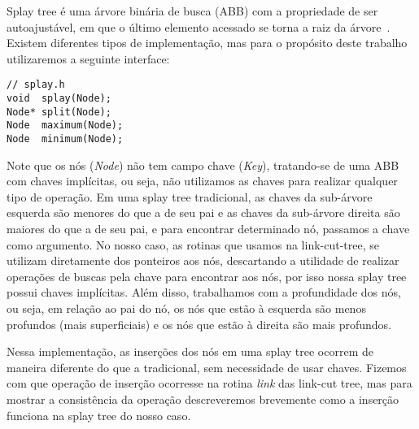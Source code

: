 Splay tree é uma árvore binária de busca (ABB) com a propriedade de ser autoajustável, em que o último elemento acessado se torna a raiz da árvore~\cite{SleatorT1985}. Existem diferentes tipos de implementação, mas para o propósito deste trabalho utilizaremos a seguinte interface:  




\begin{verbatim}
// splay.h
void  splay(Node);
Node* split(Node);
Node  maximum(Node);
Node  minimum(Node);
\end{verbatim}

Note que os nós (\textit{Node}) não tem campo chave (\textit{Key}), tratando-se de uma ABB com chaves implícitas, ou seja, não utilizamos as chaves para realizar qualquer tipo de operação. Em uma splay tree tradicional, as chaves da sub-árvore esquerda são menores do que a de seu pai e as chaves da sub-árvore direita são maiores do que a de seu pai, e para encontrar determinado nó, passamos a chave como argumento. No nosso caso, as rotinas que usamos na link-cut-tree, se utilizam diretamente dos ponteiros aos nós, descartando a utilidade de realizar operações de buscas pela chave para encontrar aos nós, por isso nossa splay tree possui chaves implícitas. Além disso, trabalhamos com a profundidade dos nós, ou seja, em relação ao pai do nó, os nós que estão à esquerda são menos profundos (mais superficiais) e os nós que estão à direita são mais profundos.  



Nessa implementação, as inserções dos nós em uma splay tree ocorrem de maneira diferente do que a tradicional, sem necessidade de usar chaves. Fizemos com que operação de inserção ocorresse na rotina \textit{link} das link-cut tree, mas para mostrar a consistência da operação descreveremos brevemente como a inserção funciona na splay tree do nosso caso.  

